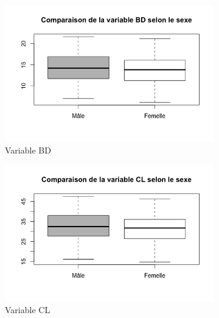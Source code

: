 \documentclass[a4paper,10pt]{report}
\begin{document}
\begin{figure}[H]
	\centering
	\captionsetup{justification=centering, margin=2cm}
	\begin{subfigure}[b]{0.3\linewidth}
		\centering
		\captionsetup{justification=centering, margin=1cm}
		\includegraphics[width=1\linewidth]{img/1-2-1-sex-bd.png}
		\caption{\scriptsize Variable BD}
		\label{fig:1_2_1_sex_bd}
	\end{subfigure}%
	\begin{subfigure}[b]{0.3\linewidth}
		\centering
		\captionsetup{justification=centering, margin=1cm}
		\includegraphics[width=1\linewidth]{img/1-2-1-sex-cl.png}
		\caption{\scriptsize Variable CL}
		\label{fig:1_2_1_sex_cl}
	\end{subfigure}%
	\begin{subfigure}[b]{0.3\linewidth}
		\centering
		\captionsetup{justification=centering, margin=1cm}

\end{subfigure}
\end{figure}
\end{document}
